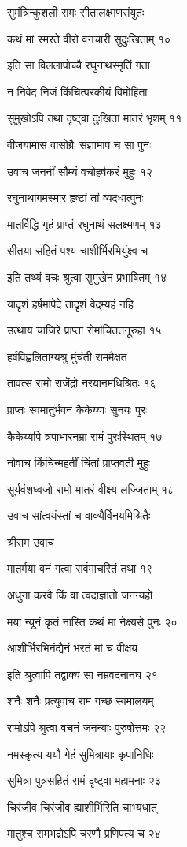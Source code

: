 सुमंत्रिन्कुशली रामः सीतालक्ष्मणसंयुतः

कथं मां स्मरते वीरो वनचारी सुदुःखिताम् १०

इति सा विललापोच्चै रघुनाथस्मृतिं गता

न निवेद निजं किंचित्परकीयं विमोहिता

सुमुखोऽपि तथा दृष्ट्वा दुःखितां मातरं भृशम् ११

वीजयामास वासोग्रैः संज्ञामाप च सा पुनः

उवाच जननीं सौम्यं वचोहर्षकरं मुहुः १२

रघुनाथागमस्मार हृष्टां तां व्यदधात्पुनः

मातर्विद्धि गृहं प्राप्तं रघुनाथं सलक्ष्मणम् १३

सीतया सहितं पश्य चाशीर्भिरभियुंक्ष्व च

इति तथ्यं वचः श्रुत्वा सुमुखेन प्रभाषितम् १४

यादृशं हर्षमापेदे तादृशं वेद्म्यहं नहि

उत्थाय चाजिरे प्राप्ता रोमांचिततनूरुहा १५

हर्षविह्वलितांग्यश्रु मुंचंती राममैक्षत

तावत्स रामो राजेंद्रो नरयानमधिश्रितः १६

प्राप्तः स्वमातुर्भवनं कैकेय्याः सुनयः पुरः

कैकेय्यपि त्रपाभारनम्रा रामं पुरःस्थितम् १७

नोवाच किंचिन्महतीं चिंतां प्राप्तवती मुहुः

सूर्यवंशध्वजो रामो मातरं वीक्ष्य लज्जिताम् १८

उवाच सांत्वयंस्तां च वाक्यैर्विनयमिश्रितैः

श्रीराम उवाच

मातर्मया वनं गत्वा सर्वमाचरितं तथा १९

अधुना करवै किं वा त्वदाज्ञातो जनन्यहो

मया न्यूनं कृतं नास्ति कथं मां नेक्ष्यसे पुनः २०

आशीर्भिरभिनंद्यैनं भरतं मां च वीक्षय

इति श्रुत्वापि तद्वाक्यं सा नम्रवदनानघ २१

शनैः शनैः प्रत्युवाच राम गच्छ स्वमालयम्

रामोऽपि श्रुत्वा वचनं जनन्याः पुरुषोत्तमः २२

नमस्कृत्य ययौ गेहं सुमित्रायाः कृपानिधिः

सुमित्रा पुत्रसहितं रामं दृष्ट्वा महामनाः २३

चिरंजीव चिरंजीव ह्याशीर्भिरिति चाभ्यधात्

मातुश्च रामभद्रोऽपि चरणौ प्रणिपत्य च २४

